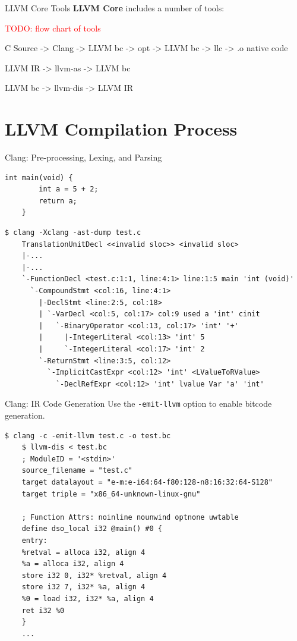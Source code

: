 \documentclass{beamer}
\newcommand{\todo}[1]{\textcolor{red}{TODO: #1}}
\begin{document}
\begin{frame}{LLVM Core Tools}
    \textbf{LLVM Core} includes a number of tools:

    \todo{flow chart of tools}

    C Source -> Clang -> LLVM bc -> opt -> LLVM bc -> llc -> .o native code

    LLVM IR -> llvm-as -> LLVM bc

    LLVM bc -> llvm-dis -> LLVM IR
\end{frame}


\section{LLVM Compilation Process}


\begin{frame}[fragile]{Clang: Pre-processing, Lexing, and Parsing}
    \begin{lstlisting}[gobble=4]
    int main(void) {
        int a = 5 + 2;
        return a;
    }
    \end{lstlisting}

    \begin{lstlisting}[gobble=4,escapeinside=~]
    $ clang -Xclang -ast-dump test.c
    TranslationUnitDecl <<invalid sloc>> <invalid sloc>
    |-...
    |-...
    `-FunctionDecl <test.c:1:1, line:4:1> line:1:5 main 'int (void)'
      `-CompoundStmt <col:16, line:4:1>
        |-DeclStmt <line:2:5, col:18>
        | `-VarDecl <col:5, col:17> col:9 used a 'int' cinit
        |   `-BinaryOperator <col:13, col:17> 'int' '+'
        |     |-IntegerLiteral <col:13> 'int' 5
        |     `-IntegerLiteral <col:17> 'int' 2
        `-ReturnStmt <line:3:5, col:12>
          `-ImplicitCastExpr <col:12> 'int' <LValueToRValue>
            `-DeclRefExpr <col:12> 'int' lvalue Var 'a' 'int'
    \end{lstlisting}
\end{frame}

\begin{frame}[fragile]{Clang: IR Code Generation}
    Use the \texttt{-emit-llvm} option to enable bitcode generation.

    \begin{lstlisting}[gobble=4]
    $ clang -c -emit-llvm test.c -o test.bc
    $ llvm-dis < test.bc
    ; ModuleID = '<stdin>'
    source_filename = "test.c"
    target datalayout = "e-m:e-i64:64-f80:128-n8:16:32:64-S128"
    target triple = "x86_64-unknown-linux-gnu"

    ; Function Attrs: noinline nounwind optnone uwtable
    define dso_local i32 @main() #0 {
    entry:
    %retval = alloca i32, align 4
    %a = alloca i32, align 4
    store i32 0, i32* %retval, align 4
    store i32 7, i32* %a, align 4
    %0 = load i32, i32* %a, align 4
    ret i32 %0
    }
    ...
    \end{lstlisting}
\end{frame}
\end{document}
